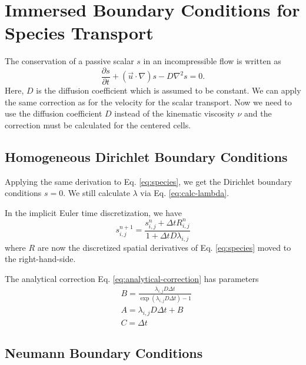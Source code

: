 \documentclass{article}
\numberwithin{equation}{section}
\newcommand{\pd}[2]{\dfrac{\partial #1}{\partial #2}}
\begin{document}
\section{Immersed Boundary Conditions for Species Transport}

The conservation of a passive scalar $s$ in an incompressible flow is written as
\begin{equation}
    \pd{s}{t} + (\vec{u} \cdot \nabla) s - D \nabla^2 s = 0.
    \label{eq:species}
\end{equation}
Here, $D$ is the diffusion coefficient which is assumed to be constant.
We can apply the same correction as for the velocity for the scalar transport.
Now we need to use the diffusion coefficient $D$ instead of the kinematic viscosity $\nu$ and
the correction must be calculated for the centered cells.

\subsection{Homogeneous Dirichlet Boundary Conditions}

Applying the same derivation to Eq. \eqref{eq:species}, we get the Dirichlet boundary conditions $s = 0$.
We still calculate $\lambda$ via Eq. \eqref{eq:calc-lambda}.

In the implicit Euler time discretization, we have
\begin{equation}
    s_{i,j}^{n+1} =
    \frac{s_{i,j}^n + \Delta t R_{i,j}^n}{1 + \Delta t D \lambda_{i,j}}
\end{equation}
where $R$ are now the discretized spatial derivatives of Eq. \eqref{eq:species} moved to the right-hand-side.

The analytical correction Eq. \eqref{eq:analytical-correction} has parameters
\begin{equation}
    \begin{split}
        &B = \frac{\lambda_{i,j} D \Delta t}{\exp(\lambda_{i,j} D \Delta t) - 1} \\
        &A = \lambda_{i,j} D \Delta t + B \\
        &C = \Delta t
    \end{split}
\end{equation}

\subsection{Neumann Boundary Conditions}
\end{document}
